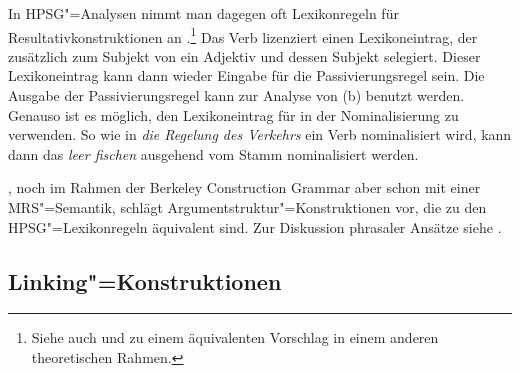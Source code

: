 In HPSG"=Analysen nimmt man dagegen oft Lexikonregeln für Resultativkonstruktionen an
\parencites{Wechsler97a,WN2001a,Verspoor97a}[Kapitel~6]{Mueller2002b,MWArgSt,MuellerLFGphrasal}.\footnote{
  Siehe auch  und
zu einem äquivalenten Vorschlag in einem
  anderen theoretischen Rahmen.%
}
Das Verb  lizenziert einen Lexikoneintrag, der zusätzlich zum Subjekt von 
ein Adjektiv und dessen Subjekt selegiert. Dieser Lexikoneintrag kann dann wieder Eingabe
für die Passivierungsregel sein. Die Ausgabe der Passivierungsregel kann zur Analyse von (b)
benutzt werden. Genauso ist es möglich, den Lexikoneintrag für  in der Nominalisierung
zu verwenden. So wie in \emph{die Regelung des Verkehrs} ein Verb nominalisiert wird, kann dann das
\emph{leer fischen} ausgehend vom Stamm nominalisiert werden.

\citet{Kay2005a}, noch im Rahmen der Berkeley Construction Grammar aber schon mit einer MRS"=Semantik, schlägt Argumentstruktur"=Konstruktionen vor,
die zu den HPSG"=Lexikonregeln äquivalent sind. Zur Diskussion phrasaler Ansätze siehe .
%

\subsection{Linking"=Konstruktionen}
\label{cxg-hpsg-linking-konstruktionen}

